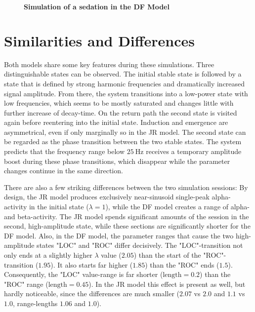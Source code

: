 \begin{figure}[H]

\caption{\textbf{Simulation of a sedation in the DF Model}
}\label{fig:sedation_sim_df}
\end{figure}

\section{Similarities and Differences}
    Both models share some key features during these simulations.
    Three distinguishable states can be observed.
    The initial stable state is followed by a state that is defined by strong harmonic frequencies and dramatically
    increased signal amplitude.
    From there, the system transitions into a low-power state with low frequencies,
    which seems to be mostly saturated and changes little with further increase of decay-time.
    On the return path the second state is visited again before reentering into the initial state.
    Induction and emergence are asymmetrical, even if only marginally so in the JR model.
    The second state can be regarded as the phase transition between the two stable states.
    The system predicts that the frequency range below $\SI{25}{\hertz}$ receives a temporary amplitude boost during
    these phase transitions, which disappear while the parameter changes continue in the same direction.


There are also a few striking differences between the two simulation sessions:
By design,
the JR model produces exclusively near-sinusoid single-peak alpha-activity in the initial state ($\lambda = 1$),
while the DF model creates a range of alpha- and beta-activity.
The JR model spends significant amounts of the session in the second, high-amplitude state,
while these sections are significantly shorter for the DF model.
Also, in the DF model,
the parameter ranges that cause the two high-amplitude states "LOC" and "ROC" differ decisively.
The "LOC"-transition not only ends at a slightly higher $\lambda$ value ($2.05$) than the start of the
"ROC"-transition ($1.95$).
It also starts far higher ($1.85$) than the "ROC" ends ($1.5$).
Consequently, the "LOC" value-range is far shorter ($\text{length}=0.2$) than the "ROC" range
($\text{length}=0.45$).
In the JR model this effect is present as well, but hardly noticeable,
since the differences are much smaller ($2.07$ vs $2.0$ and $1.1$ vs $1.0$, range-lengths $1.06$ and $1.0$).
